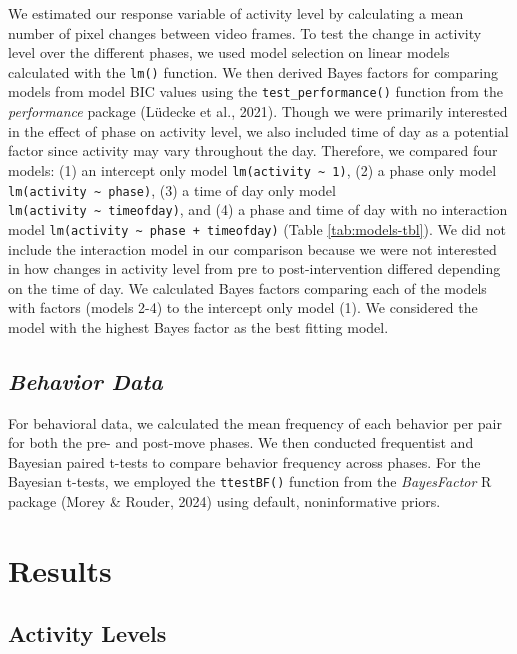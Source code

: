 \documentclass[
  pub]{apa6}
\begin{document}
We estimated our response variable of activity level by calculating a mean number of pixel changes between video frames. To test the change in activity level over the different phases, we used model selection on linear models calculated with the \texttt{lm()} function. We then derived Bayes factors for comparing models from model BIC values using the \texttt{test\_performance()} function from the \emph{performance} package (Lüdecke et al., 2021). Though we were primarily interested in the effect of phase on activity level, we also included time of day as a potential factor since activity may vary throughout the day. Therefore, we compared four models: (1) an intercept only model \texttt{lm(activity\ \textasciitilde{}\ 1)}, (2) a phase only model \texttt{lm(activity\ \textasciitilde{}\ phase)}, (3) a time of day only model \texttt{lm(activity\ \textasciitilde{}\ timeofday)}, and (4) a phase and time of day with no interaction model \texttt{lm(activity\ \textasciitilde{}\ phase\ +\ timeofday)} (Table \ref{tab:models-tbl}). We did not include the interaction model in our comparison because we were not interested in how changes in activity level from pre to post-intervention differed depending on the time of day. We calculated Bayes factors comparing each of the models with factors (models 2-4) to the intercept only model (1). We considered the model with the highest Bayes factor as the best fitting model.

\hypertarget{behavior-data}{%
\subsection{\texorpdfstring{\emph{Behavior Data}}{Behavior Data}}\label{behavior-data}}

For behavioral data, we calculated the mean frequency of each behavior per pair for both the pre- and post-move phases. We then conducted frequentist and Bayesian paired t-tests to compare behavior frequency across phases. For the Bayesian t-tests, we employed the \texttt{ttestBF()} function from the \emph{BayesFactor} R package (Morey \& Rouder, 2024) using default, noninformative priors.

\hypertarget{results}{%
\section{Results}\label{results}}

\hypertarget{activity-levels-2}{%
\subsection{Activity Levels}\label{activity-levels-2}}
\end{document}

